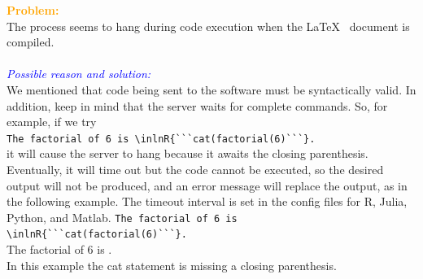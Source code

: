 \documentclass[a4paper,10pt]{article}
\newcommand{\prob}[1] {\bigskip\noindent\textbf{\textcolor{orange}{Problem:}}\\#1\\\\}
\newcommand{\cause}[1] {\noindent\textit{\textcolor{blue}{Possible reason and solution:}}\\#1}
\begin{document}


\prob{The process seems to hang during code execution when the \LaTeX~ document is compiled.}
\cause\bgroup
We mentioned that code being sent to the software must be syntactically valid. In addition, keep in mind that the server waits for complete commands. So, for example, if we try\\
\verb|The factorial of 6 is \inlnR{```cat(factorial(6)```}.|\\
it will cause the server to hang because it awaits the closing parenthesis. Eventually, it will time out but the code cannot be executed, so the desired output will not be produced, and an error message will replace the output, as in the following example. The timeout interval is set in the config files for R, Julia, Python, and Matlab.
\verb|The factorial of 6 is \inlnR{```cat(factorial(6)```}.|\\
The factorial of 6 is .\\
In this example the cat statement is missing a closing parenthesis.\\
\egroup
\end{document}
